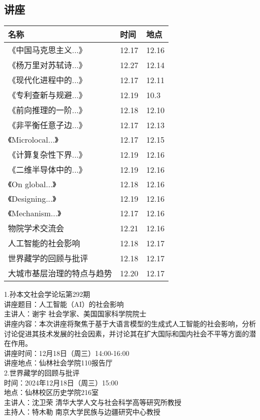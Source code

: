 \documentclass[letterpaper, 12pt]{article}
\begin{document}
\begin{multicols}{2}

\section{讲座}
\begin{tabularx}{0.5\textwidth}{|X|X|X|}
    \hline
    名称 & 时间 & 地点\\
    \hline\hline
《中国马克思主义...》& 12.17 & 12.16\\\hline
《杨万里对苏轼诗...》 & 12.27 & 12.14\\\hline
《现代化进程中的...》 & 12.17 & 12.11\\\hline
《专利查新与规避...》 & 12.19 & 10.3\\\hline
《前向推理的一阶...》 & 12.18 & 12.10\\\hline
《非平衡任意子边...》 & 12.17 & 12.13\\\hline
《Microlocal...》 & 12.17 & 12.15\\\hline
《计算复杂性下界...》 & 12.19 & 12.16\\\hline
《二维半导体中的...》 & 12.19 & 12.16\\\hline
《On global...》 & 12.18 & 12.16\\\hline
《Designing...》 & 12.19 & 12.16\\\hline
《Mechanism...》 & 12.17 & 12.16\\\hline
物院学术交流会 & 12.21 & 12.16\\\hline
人工智能的社会影响 & 12.18 & 12.17\\\hline
世界藏学的回顾与批评 & 12.18 & 12.17\\\hline
大城市基层治理的特点与趋势 & 12.20 & 12.17\\\hline
\end{tabularx}
1.孙本文社会学论坛第292期\\
讲座题目：人工智能（AI）的社会影响\\
主讲人：谢宇 社会学家、美国国家科学院院士\\
讲座内容：本次讲座将聚焦于基于大语言模型的生成式人工智能的社会影响，分析讨论促进其技术发展的社会因素，并讨论其在扩大国际和国内社会不平等方面的潜在作用。\\
讲座时间：12月18日（周三）14:00-16:00\\
讲座地点：仙林社会学院110报告厅\\

2.世界藏学的回顾与批评\\
时间：2024年12月18日（周三）15:00\\
地点：仙林校区历史学院216室\\
主讲人：沈卫荣 清华大学人文与社会科学高等研究所教授\\
主持人：特木勒 南京大学民族与边疆研究中心教授\\


\end{multicols}
\end{document}
